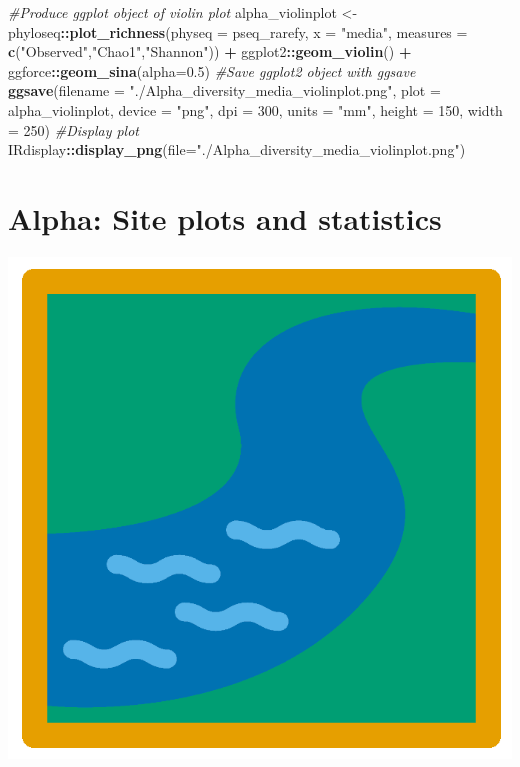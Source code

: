 \documentclass[
]{book}
\newenvironment{Shaded}{\begin{snugshade}}{\end{snugshade}}
\newcommand{\AttributeTok}[1]{\textcolor[rgb]{0.13,0.29,0.53}{#1}}
\newcommand{\CommentTok}[1]{\textcolor[rgb]{0.56,0.35,0.01}{\textit{#1}}}
\newcommand{\DecValTok}[1]{\textcolor[rgb]{0.00,0.00,0.81}{#1}}
\newcommand{\FloatTok}[1]{\textcolor[rgb]{0.00,0.00,0.81}{#1}}
\newcommand{\FunctionTok}[1]{\textcolor[rgb]{0.13,0.29,0.53}{\textbf{#1}}}
\newcommand{\NormalTok}[1]{#1}
\newcommand{\OtherTok}[1]{\textcolor[rgb]{0.56,0.35,0.01}{#1}}
\newcommand{\SpecialCharTok}[1]{\textcolor[rgb]{0.81,0.36,0.00}{\textbf{#1}}}
\newcommand{\StringTok}[1]{\textcolor[rgb]{0.31,0.60,0.02}{#1}}
\begin{document}
\begin{Shaded}
\begin{Highlighting}[]
\CommentTok{\#Produce ggplot object of violin plot}
\NormalTok{alpha\_violinplot }\OtherTok{\textless{}{-}}\NormalTok{ phyloseq}\SpecialCharTok{::}\FunctionTok{plot\_richness}\NormalTok{(}\AttributeTok{physeq =}\NormalTok{ pseq\_rarefy, }
                        \AttributeTok{x =} \StringTok{"media"}\NormalTok{,}
                        \AttributeTok{measures =} \FunctionTok{c}\NormalTok{(}\StringTok{"Observed"}\NormalTok{,}\StringTok{"Chao1"}\NormalTok{,}\StringTok{"Shannon"}\NormalTok{)) }\SpecialCharTok{+}
\NormalTok{                          ggplot2}\SpecialCharTok{::}\FunctionTok{geom\_violin}\NormalTok{() }\SpecialCharTok{+}
\NormalTok{                          ggforce}\SpecialCharTok{::}\FunctionTok{geom\_sina}\NormalTok{(}\AttributeTok{alpha=}\FloatTok{0.5}\NormalTok{)}
\CommentTok{\#Save ggplot2 object with ggsave}
\FunctionTok{ggsave}\NormalTok{(}\AttributeTok{filename =} \StringTok{"./Alpha\_diversity\_media\_violinplot.png"}\NormalTok{, }\AttributeTok{plot =}\NormalTok{ alpha\_violinplot,}
       \AttributeTok{device =} \StringTok{"png"}\NormalTok{, }\AttributeTok{dpi =} \DecValTok{300}\NormalTok{, }\AttributeTok{units =} \StringTok{"mm"}\NormalTok{, }\AttributeTok{height =} \DecValTok{150}\NormalTok{, }\AttributeTok{width =} \DecValTok{250}\NormalTok{)}
\CommentTok{\#Display plot}
\NormalTok{IRdisplay}\SpecialCharTok{::}\FunctionTok{display\_png}\NormalTok{(}\AttributeTok{file=}\StringTok{"./Alpha\_diversity\_media\_violinplot.png"}\NormalTok{)}
\end{Highlighting}
\end{Shaded}

\hypertarget{alpha-site-plots-and-statistics}{%
\section{Alpha: Site plots and statistics}\label{alpha-site-plots-and-statistics}}

\includegraphics{figures/river.png}
\end{document}
